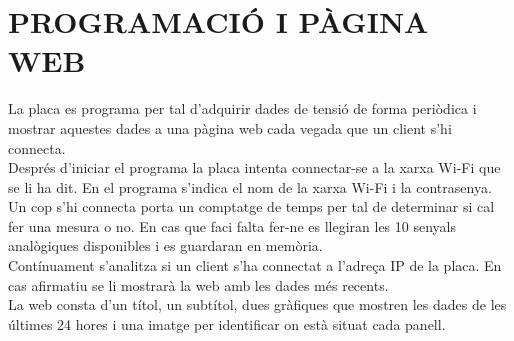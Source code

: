 \chapter{\uppercase{Programació i pàgina web}}

La placa es programa per tal d'adquirir dades de tensió de forma periòdica i mostrar aquestes dades a una pàgina web cada vegada que un client s'hi connecta.\\
\newline Després d'iniciar el programa la placa intenta connectar-se a la xarxa Wi-Fi que se li ha dit. En el programa s'indica el nom de la xarxa Wi-Fi i la contrasenya.\\
\newline Un cop s'hi connecta porta un comptatge de temps per tal de determinar si cal fer una mesura o no. En cas que faci falta fer-ne es llegiran les 10 senyals analògiques disponibles i es guardaran en memòria.\\
\newline Contínuament s'analitza si un client s'ha connectat a l'adreça IP de la placa. En cas afirmatiu se li mostrarà la web amb les dades més recents.\\
\newline La web consta d'un títol, un subtítol, dues gràfiques que mostren les dades de les últimes 24 hores i una imatge per identificar on està situat cada panell.



\clearpage


